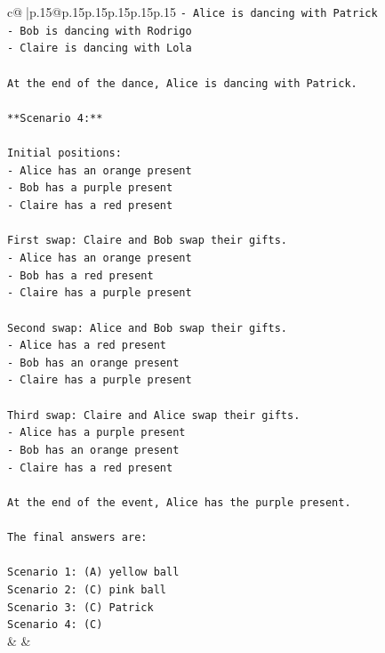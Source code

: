 \documentclass{article}
\begin{document}
{\begin{supertabular}{c@{$\;$}|p{.15\linewidth}@{}p{.15\linewidth}p{.15\linewidth}p{.15\linewidth}p{.15\linewidth}p{.15\linewidth}}
{{{\texttt{{-} Alice is dancing with Patrick} \\
\texttt{{-} Bob is dancing with Rodrigo} \\
\texttt{{-} Claire is dancing with Lola} \\
\\ 
\texttt{At the end of the dance, Alice is dancing with Patrick.} \\
\\ 
\texttt{**Scenario 4:**} \\
\\ 
\texttt{Initial positions:} \\
\texttt{{-} Alice has an orange present} \\
\texttt{{-} Bob has a purple present} \\
\texttt{{-} Claire has a red present} \\
\\ 
\texttt{First swap: Claire and Bob swap their gifts.} \\
\texttt{{-} Alice has an orange present} \\
\texttt{{-} Bob has a red present} \\
\texttt{{-} Claire has a purple present} \\
\\ 
\texttt{Second swap: Alice and Bob swap their gifts.} \\
\texttt{{-} Alice has a red present} \\
\texttt{{-} Bob has an orange present} \\
\texttt{{-} Claire has a purple present} \\
\\ 
\texttt{Third swap: Claire and Alice swap their gifts.} \\
\texttt{{-} Alice has a purple present} \\
\texttt{{-} Bob has an orange present} \\
\texttt{{-} Claire has a red present} \\
\\ 
\texttt{At the end of the event, Alice has the purple present.} \\
\\ 
\texttt{The final answers are:} \\
\\ 
\texttt{Scenario 1: (A) yellow ball} \\
\texttt{Scenario 2: (C) pink ball} \\
\texttt{Scenario 3: (C) Patrick} \\
\texttt{Scenario 4: (C)} \\
            }
        }
    }
    & & \\ \\


\end{supertabular}}
\end{document}
